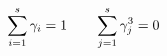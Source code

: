 \documentclass[preview]{standalone}
\begin{document}
\begin{align*}
\special{dvisvgm:raw <g id='unique000'>}\sum_{i=1}^s \gamma_i = 1 \qquad \sum^s_{j=1} \gamma_j^3 = 0\special{dvisvgm:raw </g>}
\end{align*}
\end{document}

